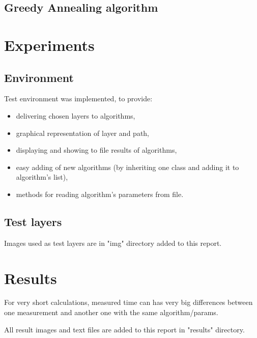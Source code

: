\documentclass[titlepage]{article}
\begin{document}
\subsection{Greedy Annealing algorithm}

\section{Experiments}
\subsection{Environment}
Test environment was implemented, to provide:
\begin{itemize}
\item delivering chosen layers to algorithms,
\item graphical representation of layer and path,
\item displaying and showing to file results of algorithms,
\item easy adding of new algorithms (by inheriting one class and adding it to algorithm's list),
\item methods for reading algorithm's parameters from file.
\end{itemize}

\subsection{Test layers}
Images used as test layers are in "img" directory added to this report.

\section{Results}
For very short calculations, measured time can has very big differences between one measurement and another one with the same algorithm/params.

All result images and text files are added to this report in "results" directory.
\end{document}
